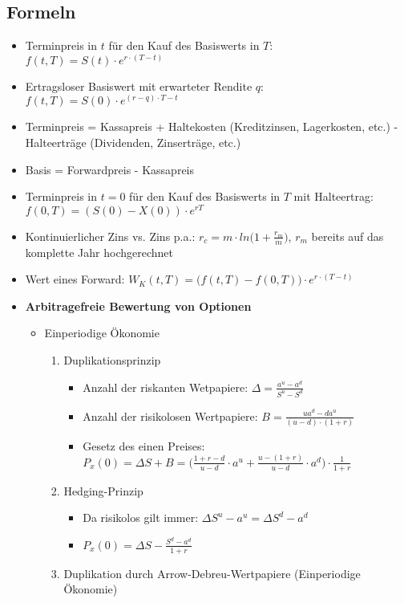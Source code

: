 \subsection{Formeln}
\begin{itemize}
	\item Terminpreis in \(t\) für den Kauf des Basiswerts in \(T\): \(f(t,T) = S(t)\cdot e^{r\cdot (T-t)}\)
	\item Ertragsloser Basiswert mit erwarteter Rendite \(q\): \(f(t,T) = S(0) \cdot e^{(r-q)\cdot T-t}\)
	\item Terminpreis = Kassapreis + Haltekosten (Kreditzinsen, Lagerkosten, etc.) - Halteerträge (Dividenden, Zinserträge, etc.)
	\item Basis = Forwardpreis - Kassapreis
	\item Terminpreis in \(t=0\) für den Kauf des Basiswerts in \(T\) mit Halteertrag: \(f(0,T) = (S(0)-X(0))\cdot e^{rT}\)
	\item Kontinuierlicher Zins vs. Zins p.a.: \(r_c = m \cdot ln\Big(1+\frac{r_m}{m}\Big)\), \(r_m\) bereits auf das komplette Jahr hochgerechnet
	\item Wert eines Forward: \(W_K(t,T) = \Big(f(t,T)-f(0,T)\Big) \cdot e^{r\cdot (T-t)}\)
	\item \textbf{Arbitragefreie Bewertung von Optionen}
	\begin{itemize}
		\item Einperiodige Ökonomie
		\begin{enumerate}
			\item Duplikationsprinzip
			\begin{itemize}
				\item Anzahl der riskanten Wetpapiere: \(\Delta=\frac{a^u-a^d}{S^u-S^d}\)
				\item Anzahl der risikolosen Wertpapiere: \(B=\frac{ua^d-da^u}{(u-d)\cdot(1+r)}\)
				\item Gesetz des einen Preises: \(P_x(0)=\Delta S+B=\Big(\frac{1+r-d}{u-d}\cdot a^u + \frac{u-(1+r)}{u-d}\cdot a^d\Big)\cdot\frac{1}{1+r}\)
			\end{itemize}
			\item Hedging-Prinzip
			\begin{itemize}
				\item Da risikolos gilt immer: \(\Delta S^u - a^u = \Delta S^d - a^d\)
				\item \(P_x(0) = \Delta S - \frac{S^d - a^d}{1+r}\)
			\end{itemize}
			\item Duplikation durch Arrow-Debreu-Wertpapiere (Einperiodige Ökonomie)

\end{enumerate}
\end{itemize}
\end{itemize}
